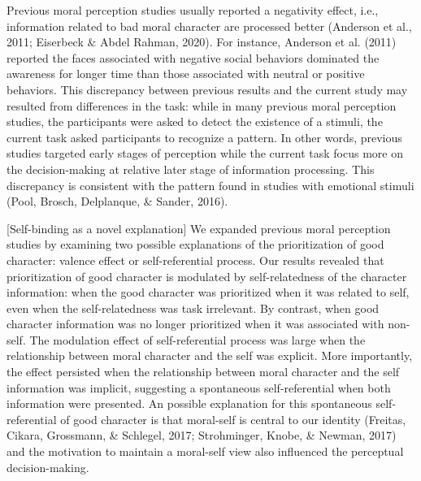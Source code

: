 \documentclass[
  man]{apa6}
\begin{document}
Previous moral perception studies usually reported a negativity effect, i.e., information related to bad moral character are processed better (Anderson et al., 2011; Eiserbeck \& Abdel Rahman, 2020). For instance, Anderson et al. (2011) reported the faces associated with negative social behaviors dominated the awareness for longer time than those associated with neutral or positive behaviors. This discrepancy between previous results and the current study may resulted from differences in the task: while in many previous moral perception studies, the participants were asked to detect the existence of a stimuli, the current task asked participants to recognize a pattern. In other words, previous studies targeted early stages of perception while the current task focus more on the decision-making at relative later stage of information processing. This discrepancy is consistent with the pattern found in studies with emotional stimuli (Pool, Brosch, Delplanque, \& Sander, 2016).

{[}Self-binding as a novel explanation{]} We expanded previous moral perception studies by examining two possible explanations of the prioritization of good character: valence effect or self-referential process. Our results revealed that prioritization of good character is modulated by self-relatedness of the character information: when the good character was prioritized when it was related to self, even when the self-relatedness was task irrelevant. By contrast, when good character information was no longer prioritized when it was associated with non-self. The modulation effect of self-referential process was large when the relationship between moral character and the self was explicit. More importantly, the effect persisted when the relationship between moral character and the self information was implicit, suggesting a spontaneous self-referential when both information were presented. An possible explanation for this spontaneous self-referential of good character is that moral-self is central to our identity (Freitas, Cikara, Grossmann, \& Schlegel, 2017; Strohminger, Knobe, \& Newman, 2017) and the motivation to maintain a moral-self view also influenced the perceptual decision-making.
\end{document}
